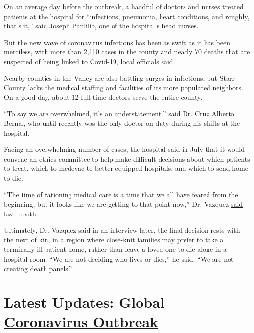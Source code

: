 On an average day before the outbreak, a handful of doctors and nurses
treated patients at the hospital for ``infections, pneumonia, heart
conditions, and roughly, that's it,'' said Joseph Panlilio, one of the
hospital's head nurses.

But the new wave of coronavirus infections has been as swift as it has
been merciless, with more than 2,110 cases in the county and nearly 70
deaths that are suspected of being linked to Covid-19, local officials
said.

Nearby counties in the Valley are also battling surges in infections,
but Starr County lacks the medical staffing and facilities of its more
populated neighbors. On a good day, about 12 full-time doctors serve the
entire county.

``To say we are overwhelmed, it's an understatement,'' said Dr. Cruz
Alberto Bernal, who until recently was the only doctor on duty during
his shifts at the hospital.

Facing an overwhelming number of cases, the hospital said in July that
it would convene an ethics committee to help make difficult decisions
about which patients to treat, which to medevac to better-equipped
hospitals, and which to send home to die.

``The time of rationing medical care is a time that we all have feared
from the beginning, but it looks like we are getting to that point
now,'' Dr. Vazquez
\href{https://www.themonitor.com/2020/07/19/starr-county-form-ethics-committee-responsible-virus-resources/}{said
last month}.

Ultimately, Dr. Vazquez said in an interview later, the final decision
rests with the next of kin, in a region where close-knit families may
prefer to take a terminally ill patient home, rather than leave a loved
one to die alone in a hospital room. ``We are not deciding who lives or
dies,'' he said. ``We are not creating death panels.''

\hypertarget{latest-updates-global-coronavirus-outbreak}{%
\section{\texorpdfstring{\href{https://www.nytimes.com/2020/08/04/world/coronavirus-cases.html?action=click\&pgtype=Article\&state=default\&region=MAIN_CONTENT_1\&context=storylines_live_updates}{Latest
Updates: Global Coronavirus
Outbreak}}{Latest Updates: Global Coronavirus Outbreak}}\label{latest-updates-global-coronavirus-outbreak}}


